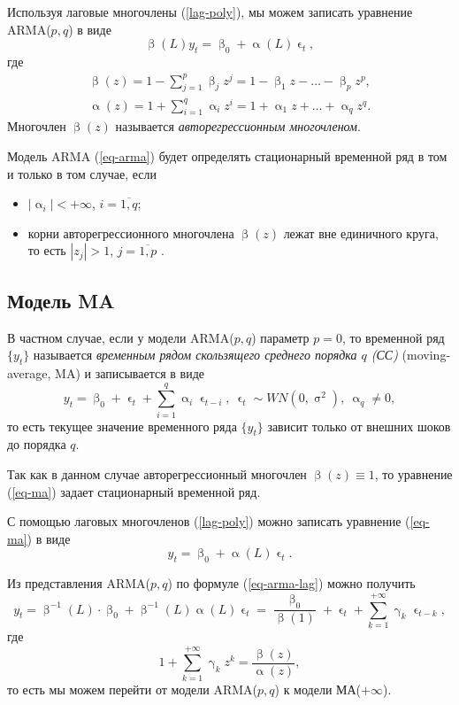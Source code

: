 \documentclass[a4paper, 14pt]{extreport}
\numberwithin{equation}{section}
\renewcommand{\alpha}{\upalpha}
\renewcommand{\beta}{\upbeta}
\renewcommand{\gamma}{\upgamma}
\renewcommand{\epsilon}{\upvarepsilon}
\renewcommand{\sigma}{\upsigma}
\numberwithin{equation}{section}
\begin{document}
	Используя лаговые многочлены (\ref{lag-poly}), мы можем записать
	уравнение ARMA($p,q$) в виде
	\begin{equation}\label{eq-arma-lag}
		\beta(L)y_t = \beta_0 + \alpha(L)\epsilon_t,
 	\end{equation}
 	где
 	\begin{eqnarray*}
 		\beta(z) = 1 - \sum_{j=1}^{p} \beta_j z^j = 1 - \beta_1 z - \ldots - \beta_p z^p,\\
 		\alpha(z) = 1 + \sum_{i=1}^{q} \alpha_i z^i = 1 + \alpha_1 z + \ldots + \alpha_q z^q.
 	\end{eqnarray*}
 	Многочлен $\beta(z)$ называется \textit{авторегрессионным многочленом}.
 	
 	Модель ARMA (\ref{eq-arma}) будет определять стационарный временной ряд в том и только в том случае, если
 	\begin{itemize}
 		\item $|\alpha_i|<+\infty$, $i=\overline{1,q}$;
 		\item корни авторегрессионного многочлена $\beta(z)$ лежат вне единичного круга, то есть $|z_j|>1$, $j=\overline{1,p}$ \cite{1}.
 	\end{itemize}
 	
 	\subsection{Модель MA}
 	\label{subsec:moving-average}
 	
 	В частном случае, если у модели ARMA($p,q$) параметр $p=0$, то временной ряд $\{y_t\}$ называется \textit{временным рядом скользящего среднего порядка $q$ (СС)}  (moving-average, MA) и записывается в виде
 	\begin{equation}\label{eq-ma}
 		y_t = \beta_0 +\epsilon_t + \sum_{i=1}^q \alpha_i \epsilon_{t-i},\ \epsilon_t\sim WN(0,\sigma^2),\ \alpha_q \ne 0,
 	\end{equation}
	то есть текущее значение временного ряда $\{y_t\}$ зависит только от внешних шоков до порядка $q$. 
	
	Так как в данном случае авторегрессионный многочлен $\beta(z) \equiv 1$, то уравнение (\ref{eq-ma}) задает стационарный временной ряд. 
	
	С помощью лаговых многочленов (\ref{lag-poly}) можно записать уравнение (\ref{eq-ma}) в виде
	\begin{equation}
		y_t = \beta_0 + \alpha(L)\epsilon_t.
	\end{equation}
	
	Из представления ARMA($p, q$) по формуле (\ref{eq-arma-lag}) можно получить
	\begin{equation}
		y_t = \beta^{-1}(L)\cdot \beta_0 + \beta^{-1}(L) \alpha(L) \epsilon_t = \dfrac{\beta_0}{\beta(1)} + \epsilon_t+ \sum_{k=1}^{+\infty} \gamma_k\epsilon_{t-k},
	\end{equation}
	где
	\begin{equation*}
		1+\sum_{k=1}^{+\infty} \gamma_kz^{k} = \dfrac{\beta(z)}{\alpha(z)},
	\end{equation*}
	то есть мы можем перейти от модели ARMA($p,q$) к модели МА($+\infty$).
	
\end{document}
